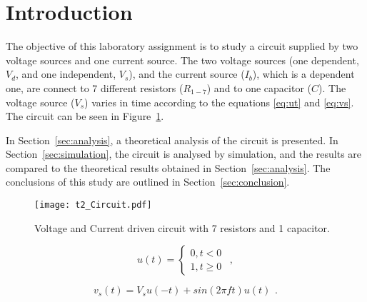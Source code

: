 \section{Introduction}
\label{sec:introduction}


\indent

The objective of this laboratory assignment is to study a circuit supplied by two voltage sources and one current source. The two voltage sources (one dependent, $V_d$,  and one independent, $V_s$), and the current source ($I_b$), which is a dependent one, are connect to 7 different resistors ($R_{1-7}$) and to one capacitor ($C$). The voltage source ($V_s$) varies in time according to the equations \ref{eq:ut} and \ref{eq:vs}. The circuit can be seen in Figure~\ref{fig:rc}.



In Section~\ref{sec:analysis}, a theoretical analysis of the circuit is
presented. In Section~\ref{sec:simulation}, the circuit is analysed by
simulation, and the results are compared to the theoretical results obtained in
Section~\ref{sec:analysis}. The conclusions of this study are outlined in
Section~\ref{sec:conclusion}.


\begin{figure}[h] \centering
\texttt{[image: t2\_Circuit.pdf]}
\caption{Voltage and Current driven circuit with 7 resistors and 1 capacitor.}
\label{fig:rc}
\end{figure}

\begin{equation}
    u(t)=\begin{cases} 0, t<0 \\ 1, t\geq0 \end{cases} \hspace{5pt},
    \label{eq:ut}
\end{equation}

\begin{equation}
    v_s(t)=V_su(-t)+sin(2\pi ft)u(t) \hspace{5pt}.
    \label{eq:vs}
\end{equation}